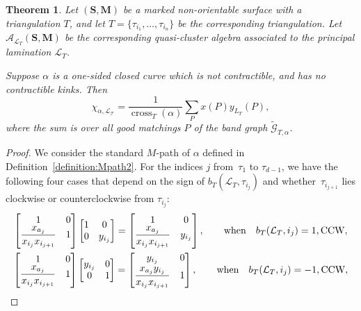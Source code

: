 \documentclass[pdftex]{sigma}
\numberwithin{equation}{section}
\newtheorem{Theorem}{Theorem}[section]
\theoremstyle{definition}
\newcommand{\SM}{(\mathbf{S}, \mathbf{M})}
\begin{document}
\begin{Theorem}\label{thm:matrixformula}
Let $\SM$ be a marked non-orientable surface with a triangulation $T$, and let $T=\{\tau_{i_1}, \ldots, \tau_{i_n}\}$ be the corresponding triangulation. Let $\mathcal{A}_{\mathcal{L}_T}\SM$ be the corresponding quasi-cluster algebra associated to the principal lamination $\mathcal{L}_T$.

Suppose $\alpha$ is a one-sided closed curve which is not contractible, and has no contractible kinks. Then{\samepage \[\displaystyle\chi_{\alpha, \mathcal{L_T}}=\frac{1}{\operatorname{cross}_T(\alpha)}\sum_{P}x(P)y_{L_T}(P),\] where the sum is over all good matchings $P$ of the band graph $\widetilde{\mathcal{G}}_{T, \alpha}$.}
\end{Theorem}
\begin{proof}
We consider the standard $M$-path of $\alpha$ defined in Definition~\ref{definition:Mpath2}. For the indices $j$ from~$\tau_{1}$ to $\tau_{d-1}$, we have the following four cases that depend on the sign of $b_T(\mathcal{L}_T, \tau_{i_j})$ and whether~$\tau_{i_{j+1}}$ lies clockwise or counterclockwise from $\tau_{i_j}$:
\begin{gather}
 \begin{bmatrix}
 1 & 0\\
 \dfrac{x_{a_j}}{x_{i_j}x_{i_{j+1}}} & 1
 \end{bmatrix}
 \begin{bmatrix}
 1 & 0\\
 0 & y_{i_j}
 \end{bmatrix}=
 \begin{bmatrix}
 1 & 0\\
 \dfrac{x_{a_j}}{x_{i_j}x_{i_{j+1}}} & y_{i_j}
 \end{bmatrix},\qquad\text{when}\quad b_T(\mathcal{L}_T, i_j)=1, \text{CCW},\label{eqn:ccw+1}\\
 \begin{bmatrix}
 1 & 0\\
 \dfrac{x_{a_j}}{x_{i_j}x_{i_{j+1}}} & 1
 \end{bmatrix}
 \begin{bmatrix}
 y_{i_j} & 0\\
 0 & 1
 \end{bmatrix}=
 \begin{bmatrix}
 y_{i_j} & 0\vspace{1mm}\\
 \dfrac{x_{a_j}y_{i_j}}{x_{i_j}x_{i_{j+1}}} & 1
 \end{bmatrix} ,\qquad\text{when}\quad b_T(\mathcal{L}_T, i_j)=-1, \text{CCW},\label{eqn:ccw-1}\\

\end{gather}
\end{proof}
\end{document}
